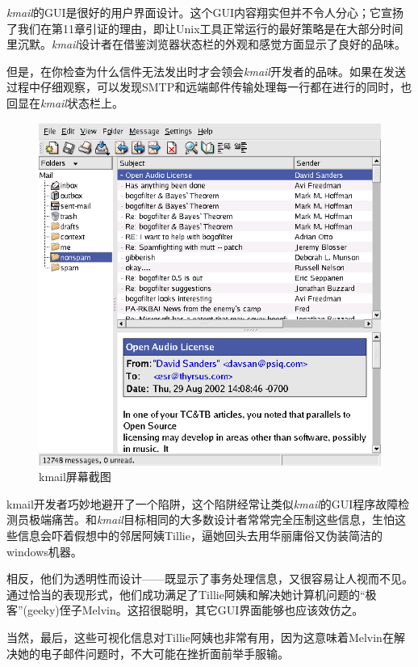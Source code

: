 \documentclass[12pt,oneside]{book}
\begin{document}
\textit{kmail}的GUI是很好的用户界面设计。这个GUI内容翔实但并不令人分心；它宣扬了我们在第11章引证的理由，即让Unix工具正常运行的最好策略是在大部分时间里沉默。\textit{kmail}设计者在借鉴浏览器状态栏的外观和感觉方面显示了良好的品味。

但是，在你检查为什么信件无法发出时才会领会\textit{kmail}开发者的品味。如果在发送过程中仔细观察，可以发现SMTP和远端邮件传输处理每一行都在进行的同时，也回显在\textit{kmail}状态栏上。

\begin{figure}[H]
\centering
\includegraphics[width=\linewidth ,totalheight=0.95\textheight , keepaspectratio]{kmail.png}
\caption{kmail屏幕截图}
\end{figure}


kmail开发者巧妙地避开了一个陷阱，这个陷阱经常让类似\textit{kmail}的GUI程序故障检测员极端痛苦。和\textit{kmail}目标相同的大多数设计者常常完全压制这些信息，生怕这些信息会吓着假想中的邻居阿姨Tillie，逼她回头去用华丽庸俗又伪装简洁的windows机器。

相反，他们为透明性而设计——既显示了事务处理信息，又很容易让人视而不见。通过恰当的表现形式，他们成功满足了Tillie阿姨和解决她计算机问题的“极客”(geeky)侄子Melvin。这招很聪明，其它GUI界面能够也应该效仿之。

当然，最后，这些可视化信息对Tillie阿姨也非常有用，因为这意味着Melvin在解决她的电子邮件问题时，不大可能在挫折面前举手服输。
\end{document}
